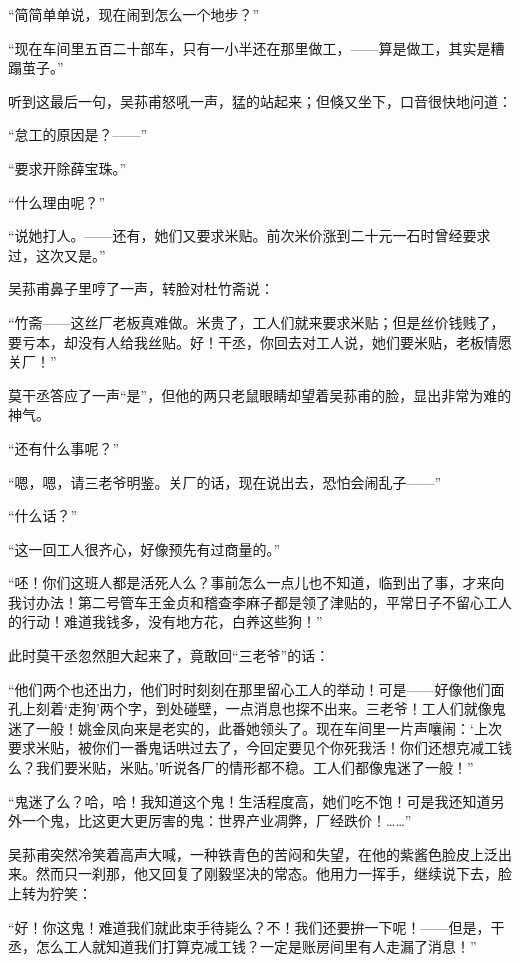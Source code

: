 \par “简简单单说，现在闹到怎么一个地步？”
\par “现在车间里五百二十部车，只有一小半还在那里做工，——算是做工，其实是糟蹋茧子。”
\par 听到这最后一句，吴荪甫怒吼一声，猛的站起来；但倏又坐下，口音很快地问道：
\par “怠工的原因是？——”
\par “要求开除薛宝珠。”
\par “什么理由呢？”
\par “说她打人。——还有，她们又要求米贴。前次米价涨到二十元一石时曾经要求过，这次又是。”
\par 吴荪甫鼻子里哼了一声，转脸对杜竹斋说：
\par “竹斋——这丝厂老板真难做。米贵了，工人们就来要求米贴；但是丝价钱贱了，要亏本，却没有人给我丝贴。好！干丞，你回去对工人说，她们要米贴，老板情愿关厂！”
\par 莫干丞答应了一声“是”，但他的两只老鼠眼睛却望着吴荪甫的脸，显出非常为难的神气。
\par “还有什么事呢？”
\par “嗯，嗯，请三老爷明鉴。关厂的话，现在说出去，恐怕会闹乱子——”
\par “什么话？”
\par “这一回工人很齐心，好像预先有过商量的。”
\par “呸！你们这班人都是活死人么？事前怎么一点儿也不知道，临到出了事，才来向我讨办法！第二号管车王金贞和稽查李麻子都是领了津贴的，平常日子不留心工人的行动！难道我钱多，没有地方花，白养这些狗！”
\par 此时莫干丞忽然胆大起来了，竟敢回“三老爷”的话：
\par “他们两个也还出力，他们时时刻刻在那里留心工人的举动！可是——好像他们面孔上刻着‘走狗’两个字，到处碰壁，一点消息也探不出来。三老爷！工人们就像鬼迷了一般！姚金凤向来是老实的，此番她领头了。现在车间里一片声嚷闹：‘上次要求米贴，被你们一番鬼话哄过去了，今回定要见个你死我活！你们还想克减工钱么？我们要米贴，米贴。’听说各厂的情形都不稳。工人们都像鬼迷了一般！”
\par “鬼迷了么？哈，哈！我知道这个鬼！生活程度高，她们吃不饱！可是我还知道另外一个鬼，比这更大更厉害的鬼：世界产业凋弊，厂经跌价！……”
\par 吴荪甫突然冷笑着高声大喊，一种铁青色的苦闷和失望，在他的紫酱色脸皮上泛出来。然而只一刹那，他又回复了刚毅坚决的常态。他用力一挥手，继续说下去，脸上转为狞笑：
\par “好！你这鬼！难道我们就此束手待毙么？不！我们还要拚一下呢！——但是，干丞，怎么工人就知道我们打算克减工钱？一定是账房间里有人走漏了消息！”
